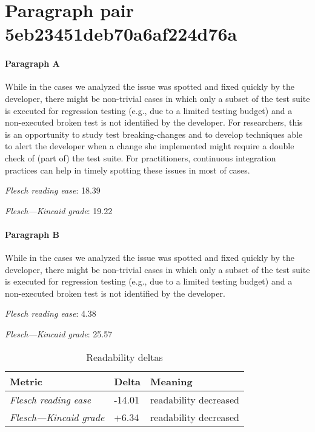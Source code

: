 \newpage
\section{Paragraph pair 5eb23451deb70a6af224d76a}
\paragraph{Paragraph A}
While in the cases we analyzed the issue was spotted and fixed quickly by the developer, there might be non-trivial cases in which only a subset of the test suite is executed for regression testing (e.g., due to a limited testing budget) and a non-executed broken test is not identified by the developer. For researchers, this is an opportunity to study test breaking-changes and to develop techniques able to alert the developer when a change she implemented might require a double check of (part of) the test suite. For practitioners, continuous integration practices can help in timely spotting these issues in most of cases.\par\medskip
\emph{Flesch reading ease}: 18.39\par
\emph{Flesch---Kincaid grade}: 19.22

\paragraph{Paragraph B}
While in the cases we analyzed the issue was spotted and fixed quickly by the developer, there might be non-trivial cases in which only a subset of the test suite is executed for regression testing (e.g., due to a limited testing budget) and a non-executed broken test is not identified by the developer.\par\medskip
\emph{Flesch reading ease}: 4.38\par
\emph{Flesch---Kincaid grade}: 25.57

\bigskip\begin{table}[!h]
\centering
\begin{tabular}{lll}
\toprule
               \textbf{Metric} & \textbf{Delta} &       \textbf{Meaning} \\
\midrule
    \emph{Flesch reading ease} &         -14.01 &  readability decreased \\
 \emph{Flesch---Kincaid grade} &          +6.34 &  readability decreased \\
\bottomrule
\end{tabular}
\caption*{Readability deltas}\end{table}

